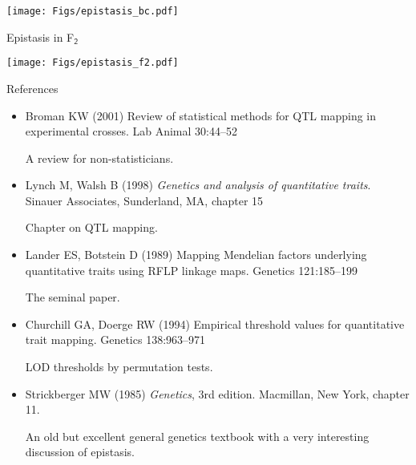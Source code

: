 \documentclass[12pt]{article}
\newcommand{\headsize}{\fontsize{35}{35} \selectfont}
\newcommand{\smallestsize}{\fontsize{18}{22} \selectfont}
\begin{document}
\centerline{\texttt{[image: Figs/epistasis\_bc.pdf]}}


\newpage

\headsize \color{myyellow}
\hfill \begin{minipage}{5.75in}
\centering
Epistasis in F$_{\mathsf{2}}$
\end{minipage}

\vfill

\centerline{\texttt{[image: Figs/epistasis\_f2.pdf]}}






\newpage

\headsize \color{myyellow}
\hfill \begin{minipage}{5.75in}
\centering
References
\end{minipage}

\vspace{15mm}

\color{mywhite} \smallestsize

\hspace*{0.5in}
\begin{minipage}{9.5in}
\begin{itemize}
\itemsep12pt
\item Broman KW (2001) Review of statistical methods for QTL mapping in
experimental crosses. Lab Animal 30:44--52

{\color{myblue} A review for non-statisticians.}

\item Lynch M, Walsh B (1998) \emph{Genetics and analysis of quantitative
traits}. Sinauer Associates, Sunderland, MA, chapter 15

{\color{myblue} Chapter on QTL mapping.}

\item Lander ES, Botstein D (1989) Mapping Mendelian factors underlying
quantitative traits using RFLP linkage maps. Genetics
121:185--199

{\color{myblue} The seminal paper.}

\item Churchill GA, Doerge RW (1994) Empirical threshold values for
quantitative trait mapping. Genetics 138:963--971

{\color{myblue} LOD thresholds by permutation tests.}

\item Strickberger MW (1985) \emph{Genetics}, 3rd edition.  Macmillan,
New York, chapter 11.

{\color{myblue} An old but excellent general genetics textbook with a very
interesting discussion of epistasis.}


\end{itemize}
\end{minipage}
\end{document}
